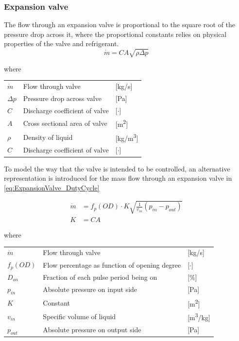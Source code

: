 \subsubsection{Expansion valve}
The flow through an expansion valve is proportional to the square root of the pressure drop across it, where the proportional constants relies on physical properties of the valve and refrigerant.
\begin{equation} \label{eq:ExpansionValve}
	\dot{m}= C A \sqrt{\rho\Delta p}
\end{equation}

where 
\begin{center}
	\begin{tabular}{l p{8cm} l}
		$\dot{m}$ 	& Flow through valve & [\si{kg}/\si{s}]\\ 
		$\Delta p$ 	& Pressure drop across valve & [\si{Pa}]\\
		$C$ 		& Discharge coefficient of valve & [$\cdot$]\\
		$A$	 		& Cross sectional area of valve & [\si{m^2}]\\
		$\rho$ 		& Density of liquid & [\si{kg}/\si{m^3}]\\
			$C$ 	& Discharge coefficient of valve & [$\cdot$]\\
	\end{tabular}
\end{center}

To model the way that the valve is intended to be controlled, an alternative representation is introduced for the mass flow through an expansion valve in \cref{eq:ExpansionValve_DutyCycle}


\begin{equation} \label{eq:ExpansionValve_DutyCycle} 
	\begin{split}
		\dot{m} &= f_p(OD) \cdot K  \sqrt{\frac{1}{v_{in}} (p_{in} - p_{out})}\\
		K 			&= C A
	\end{split}
\end{equation}

where 
\begin{center}
	\begin{tabular}{l p{8cm} l}
		$\dot{m}$	& Flow through valve & [\si{kg}/\si{s}]\\ 
		$f_p(OD)$ & Flow percentage as function of opening degree & [$\cdot$] \\
		$D_{on}$ 	& Fraction of each pulse period being on & [$\%$]\\
		$p_{in}$ 	& Absolute pressure on input side & [\si{Pa}]\\
		$K$ 		& Constant & [\si{m^2}]\\
		$v_{in}$ 	& Specific volume of liquid & [\si{m^3}/\si{kg}]\\
		$p_{out}$ 	& Absolute pressure on output side & [\si{Pa}]\\
	\end{tabular}
\end{center}

